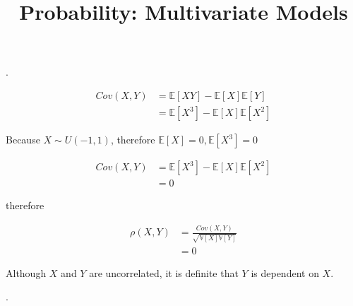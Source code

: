 \documentclass[UTF8]{article}
\title{Probability: Multivariate Models}
\date{}
\begin{document}
\maketitle

.

\begin{align*}
    Cov(X, Y) &= \mathbb{E}[XY] - \mathbb{E}[X]\mathbb{E}[Y]\\
    &=\mathbb{E}[X^3] - \mathbb{E}[X]\mathbb{E}[X^2]
\end{align*}

Because $X\sim U(-1, 1)$, therefore $\mathbb{E}[X] = 0, \mathbb{E}[X^3] = 0$

\begin{align*}
    Cov(X, Y) &=\mathbb{E}[X^3] - \mathbb{E}[X]\mathbb{E}[X^2]\\
    &=0
\end{align*}

therefore

\begin{align*}
    \rho(X, Y) &=\frac{Cov(X, Y)}{\sqrt{\mathbb{V}[X]\mathbb{V}[Y]}}\\
    &=0
\end{align*}

Although $X$ and $Y$ are uncorrelated, it is definite that $Y$ is dependent on $X$.

.
\end{document}
